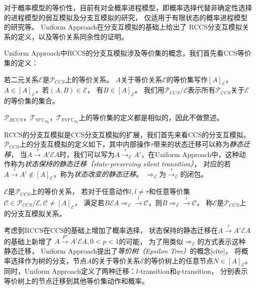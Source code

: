    对于概率模型的等价性，目前有对全概率进程模型，即概率选择代替非确定性选择的进程模型的弱互模拟及分支互模拟的研究\cite{全概率的弱互模拟和分支互模拟}，
   仅适用于有限状态的概率进程模型的研究\cite{有限状态_1,有限状态_2}等。
   Uniform Approach在分支互模拟\cite{Branching_1, Branching_2}的基础上给出了
   RCCS分支互模拟关系的定义，以及等价关系同余性的证明。
   
   Uniform Approach中RCCS的分支互模拟涉及等价集的概念，我们首先看CCS等价集的定义：
   \begin{definition}
      若二元关系$\mathcal{E}$是$\mathcal{P}_{CCS}$上的等价关系。
      $A$关于等价关系$\mathcal{E}$的等价集写作$[A]_{\mathcal{E}}$，
      $A\in [A]_{\mathcal{E}}$，若$(A,B)\in \mathcal{E}$，
      有$B\in [A]_{\mathcal{E}}$。
      我们用$\mathcal{P}_{CCS}/\mathcal{E}$表示所有$\mathcal{P}_{CCS}$关于$\mathcal{E}$的等价集的集合。
   \end{definition}
   $\mathcal{P}_{RCCS}$，$\mathcal{T}_{\mathbb{VPC}_{\mathsf{Th}}}$，$\mathcal{T}_{\mathbb{RVPC}_{\mathsf{Th}}}$上的等价集的定义都是相似的，因此不做赘述。

   RCCS的分支互模拟是CCS分支互模拟的扩展，我们首先来看CCS的分支互模拟。
   $\mathcal{P}_{CCS}$上的分支互模拟的定义如下，其中内部操作$\tau$带来的状态迁移可以称为\textit{静态迁移}，
   当$A\stackrel{\tau}{\rightarrow}A'\mathcal{E}A$时，我们可以写为$A\stackrel{\tau}{\rightarrow}_{\mathcal{E}}A'$，在Uniform Approach中，这种动作称为\textit{状态保持的静态迁移（state-preserving silent transition）}，
   对应的若$A\stackrel{\tau}{\rightarrow}A'\notin [A]_{\mathcal{E}}$，称为\textit{状态改变的静态迁移}。
   $\Rightarrow_{\mathcal{E}}$为$\stackrel{\tau}{\rightarrow}_{\mathcal{E}}$的闭包。
   \begin{definition}
      $\mathcal{E}$是$\mathcal{P}_{CCS}$上的等价关系，
      若对于任意动作$l,l\neq \tau$和任意等价集$\mathcal{C}\in \mathcal{P}_{CCS}/\mathcal{E}, \mathcal{C}\neq [A]_{\mathcal{E}}$，
      满足若$B\mathcal{E}A\Rightarrow_{\mathcal{E}}\stackrel{l}{\rightarrow}\mathcal{C}$，则$B\Rightarrow_{\mathcal{E}}\stackrel{l}{\rightarrow}\mathcal{C}$，
      称$\mathcal{E}$是$\mathcal{P}_{CCS}$上的分支互模拟关系。
   \end{definition}

   考虑到RCCS在CCS的基础上增加了概率选择，
   状态保持的静态迁移在$A\stackrel{\tau}{\rightarrow}A'\mathcal{E}A$的基础上新增了
   $A\stackrel{p\tau}{\rightarrow} A'\mathcal{E}A,0<p<1$的可能，
   为了用类似$\Rightarrow_{\mathcal{E}}$的方式表示这种静态迁移，
   Uniform Approach提出了\textit{等价树（Epsilon Tree）}的概念[cite]，
   将概率选择作为树的分支，节点$A$的关于等价关系$\mathcal{E}$的等价树上的任意节点$N\in [A]_{\mathcal{E}}$。
   同时，Uniform Approach定义了两种迁移：$l$-transition和$q$-transition，
   分别表示等价树上的节点迁移到其他等价集动作和概率。

